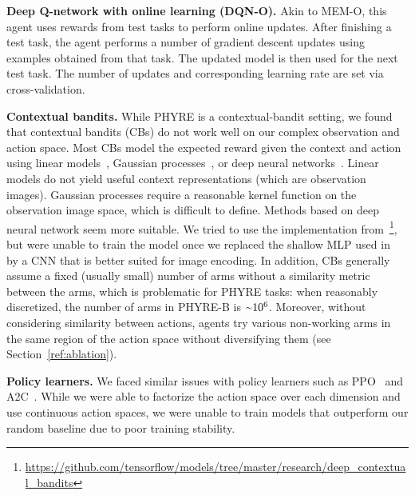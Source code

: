 \documentclass{article}
\newcommand{\app}{\raise.17ex\hbox{$\scriptstyle\sim$}}
\begin{document}
\noindent\textbf{Deep Q-network with online learning (DQN-O).} Akin to MEM-O, this agent uses rewards from test tasks to perform online updates. After finishing a test task, the agent performs a number of gradient descent updates using examples obtained from that task. The updated model is then used for the next test task. The number of updates and corresponding learning rate are set via cross-validation.

\noindent\textbf{Contextual bandits.}
While PHYRE is a contextual-bandit setting, we found that contextual bandits (CBs) do not work well on our complex observation and action space.
Most CBs model the expected reward given the context and action using linear models~\cite{chapelle2011empirical,chu2011contextual,li2010contextual}, Gaussian processes~\cite{srinivas2009gaussian}, or deep neural networks~\cite{riquelme2018deep}.
Linear models do not yield useful context representations (which are observation images).
Gaussian processes require a reasonable kernel function on the observation image space, which is difficult to define.
Methods based on deep neural network seem more suitable. We tried to use the implementation from~\cite{riquelme2018deep}\footnote{\scriptsize{\url{https://github.com/tensorflow/models/tree/master/research/deep_contextual_bandits}}}, but were unable to train the model once we replaced the shallow MLP used in~\cite{riquelme2018deep} by a CNN that is better suited for image encoding.
In addition, CBs generally assume a fixed (usually small) number of arms without a similarity metric between the arms, which is problematic for PHYRE tasks: when reasonably discretized, the number of arms in PHYRE-B is $\app 10^6$.
Moreover, without considering similarity between actions, agents try various non-working arms in the same region of the action space without diversifying them (see Section~\ref{ref:ablation}).

\noindent\textbf{Policy learners.}  We faced similar issues with policy learners such as PPO~\cite{schulman2017ppo} and A2C~\cite{mnih2016a2c}.
While we were able to factorize the action space over each dimension and use continuous action spaces, we were unable to train models that outperform our random baseline due to poor training stability.
\end{document}
